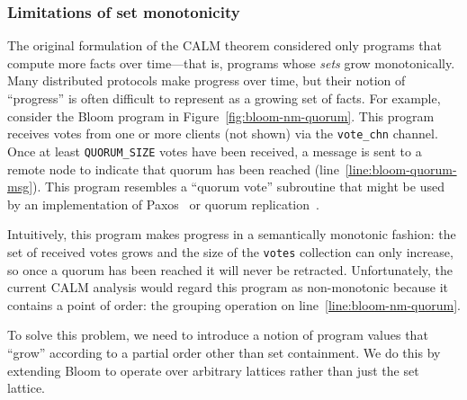 \subsubsection{Limitations of set monotonicity}
The original formulation of the CALM theorem considered only programs that
compute more facts over time---that is, programs whose \emph{sets} grow
monotonically. Many distributed protocols make progress over time, but their
notion of ``progress'' is often difficult to represent as a growing set of
facts. For example, consider the Bloom program in
Figure~\ref{fig:bloom-nm-quorum}. This program receives votes from one or more
clients (not shown) via the \texttt{vote\_chn} channel. Once at least
\texttt{QUORUM\_SIZE} votes have been received, a message is sent to a remote
node to indicate that quorum has been reached
(line~\ref{line:bloom-quorum-msg}). This program resembles a ``quorum vote''
subroutine that might be used by an implementation of Paxos~\cite{Lamport1998}
or quorum replication~\cite{Gifford1979}.

Intuitively, this program makes progress in a semantically monotonic fashion:
the set of received votes grows and the size of the \texttt{votes} collection
can only increase, so once a quorum has been reached it will never be
retracted. Unfortunately, the current CALM analysis would regard this program as
non-monotonic because it contains a point of order: the grouping operation on
line~\ref{line:bloom-nm-quorum}.

To solve this problem, we need to introduce a notion of program values that
``grow'' according to a partial order other than set containment. We do this by
extending Bloom to operate over arbitrary lattices rather than just the
set lattice.


